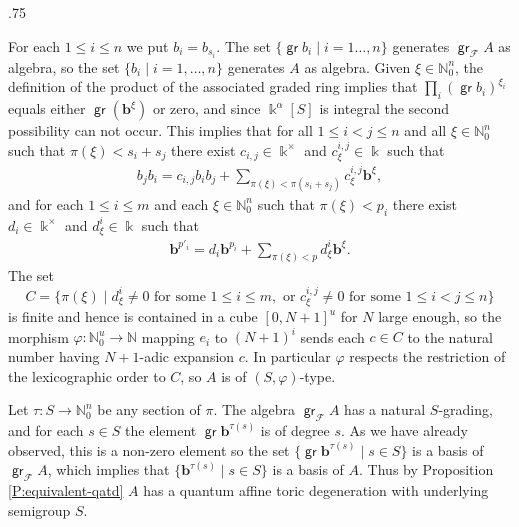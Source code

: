 \documentclass[11pt,fleqn]{article}
\makeatletter
\renewenvironment{proof}[1][\textit{Proof}]{\par
  \pushQED{\qed}%
  \normalfont \topsep.75\paraskip\relax
  \trivlist
  \item[\hskip\labelsep
        \itshape
    #1\@addpunct{.}]\ignorespaces
}{%
  \popQED\endtrivlist\@endpefalse
}
\newcommand\NN{\mathbb N}
\renewcommand\to{\longrightarrow}
\renewcommand\phi{\varphi}
\newcommand\F{\mathcal F}
\renewcommand\b{\mathbf b}
\renewcommand\k{\Bbbk}
\DeclareMathOperator\gr{\mathsf{gr}}
\makeatother
\begin{document}
\begin{proof}
For each $1 \leq i \leq n$ we put $b_i = b_{s_i}$. The set $\{\gr b_i \mid i = 1 \ldots, 
n\}$ generates $\gr_\F A$ as algebra, so the set $\{b_i \mid i = 1, \ldots, n\}$ 
generates $A$ as algebra. Given $\xi \in \NN_0^n$, the definition of the product of 
the associated graded ring implies that $\prod_i(\gr b_i)^{\xi_i}$ equals either $\gr 
(\b^\xi)$ or zero, and since $\k^\alpha[S]$ is integral the second possibility can 
not occur. This implies that for all $1 \leq i < j \leq n$ and all $\xi \in \NN_0^n$ 
such that $\pi(\xi) < s_i +s_j$ there exist $c_{i,j} \in \k^\times$ and $c^{i,j}_\xi \in 
\k$ such that
\begin{align*}
  b_j b_i = c_{i,j} b_i b_j + \sum_{\pi(\xi) < \pi(s_i + s_j)} c^{i,j}_\xi
    \b^\xi,
\end{align*}
and for each $1 \leq i \leq m$ and each $\xi \in \NN_0^n$ such that $\pi(\xi) < p_i$ 
there exist $d_i \in \k^\times$ and $d^i_\xi \in \k$ such that
\begin{align*}
  \b^{p'_i} = d_i \b^{p_i} + \sum_{\pi(\xi) < p} d^i_\xi \b^\xi.
\end{align*}
The set 
\[
  C 
    =\{\pi(\xi) \mid d^i_\xi \neq 0 \mbox{ for some } 1 \leq i \leq m, 
      \mbox{ or } c^{i,j}_\xi \neq 0 \mbox{ for some $1 \leq i < j \leq n$}\}
\]
is finite and hence is contained in a cube $[0,N+1]^u$ for $N$ large enough, so the 
morphism $\phi: \NN_0^u \to \NN$ mapping $e_i$ to $(N+1)^i$ sends each $c \in C$ to 
the natural number having $N+1$-adic expansion $c$. In particular $\phi$ respects the 
restriction of the lexicographic order to $C$, so $A$ is of $(S,\phi)$-type. 

Let $\tau: S \to \NN_0^n$ be any section of $\pi$. The algebra $\gr_\F A$ has a natural 
$S$-grading, and for each $s \in S$ the element $\gr \b^{\tau(s)}$ is of degree $s$. As 
we have already observed, this is a non-zero element so the set $\{\gr \b^{\tau(s)} \mid 
s \in S\}$ is a basis of $\gr_\F A$, which implies that $\{\b^{\tau(s)} \mid s \in S\}$ 
is a basis of $A$. Thus by Proposition \ref{P:equivalent-qatd} $A$ has a quantum affine 
toric degeneration with underlying semigroup $S$.
\end{proof}
\end{document}
